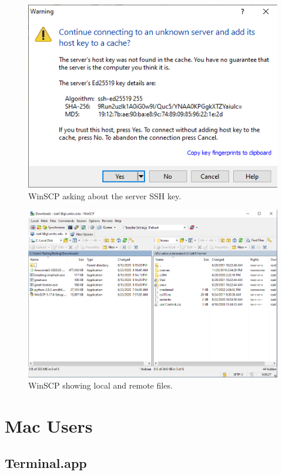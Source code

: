 \documentclass[letter,11pt]{article}
\begin{document}
\begin{figure}
\centering
\includegraphics[scale=0.7]{Images/winscp_connect_first_time.png}
\caption{WinSCP asking about the server SSH key.}
\label{fig:winscpconnectfirsttime}
\end{figure}

\begin{figure}
\centering
\includegraphics[scale=0.6]{Images/winscp_connected.png}
\caption{WinSCP showing local and remote files.}
\label{fig:winscpconnected}
\end{figure}

\FloatBarrier
\section{Mac Users}
\subsection{Terminal.app}
\end{document}
